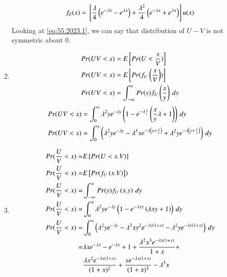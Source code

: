 \documentclass[journal,12pt,twocolumn]{IEEEtran}
\theoremstyle{remark}
\begin{document}
\begin{enumerate}
\begin{align}
f_Z(x) = {}\left[\frac{\lambda}{4}\left(e^{-\lambda x}-e^{\lambda x}\right) + \frac{\lambda^2}{4}\left(e^{-\lambda x}+e^{\lambda x}\right)\right]u(x) \label{eq:55.2023.1}
\end{align}
Looking at \eqref{eq:55.2023.1}, we can say that distribution of $U-V$ is not symmetric about 0.
\item 
\begin{align}
Pr(UV<x) &= E{}\left[Pr(U<\frac{x}{V})\right]\\
Pr(UV<x) &= E{}\left[Pr(f_{U}\left(\frac{x}{V}\right))\right]\\
Pr(UV<x) &= \int_{-\infty}^{x} Pr(y)f_{U}\left(\frac{x}{y}\right) \, dy\\
\end{align}
\begin{align}
Pr(UV<x) &= \int_{0}^{x} \lambda^{2}ye^{-\lambda y} \left(1 - e^{-\lambda \frac{x}{y}}\left(\frac{x}{y}\lambda  + 1\right)\right)  \, dy\\
Pr(UV<x) &= \int_{0}^{x} \left(\lambda^{2}ye^{-\lambda y} - \lambda^{3}xe^{-\lambda\left( y + \frac{x}{y}\right)} + \lambda^{2}ye^{-\lambda\left( y + \frac{x}{y}\right)} \right)\, dy\\
\end{align}
\item
\begin{align}
Pr(\frac{U}{V}<x) =& E{}\left[Pr(U<x.V)\right]\\
Pr(\frac{U}{V}<x) =& E{}\left[Pr(f_{U}\left(x.V\right)\right])\\
Pr(\frac{U}{V}<x) =& \int_{-\infty}^{x} Pr(y)f_{U}\left(x.y\right) \, dy\\
Pr(\frac{U}{V}<x) =& \int_{0}^{x} \lambda^{2}ye^{-\lambda y} \left(1 - e^{-\lambda xy}\left(\lambda xy   + 1\right)\right)  \, dy\\
Pr(\frac{U}{V}<x) =& \int_{0}^{x} \left(\lambda^{2}ye^{-\lambda y} - \lambda^{3}x y^{2} e^{-\lambda y \left( 1 + x\right)} - \lambda^{2}ye^{-\lambda y \left( 1 + x\right)} \right)\, dy\\
=&  \lambda xe^{-\lambda x} -e^{-\lambda x} +1 + \frac{\lambda ^{2} x^{3} e^{-\lambda x(1+x)}}{1+x} + \\& \frac{\lambda x^{2} e^{-\lambda x(1+x)}}{(1+x)^{2}} + \frac{x e^{-\lambda x(1+x)}}{(1+x)^3} - \lambda ^{3} x
\end{align}
\end{enumerate}
\end{document}
